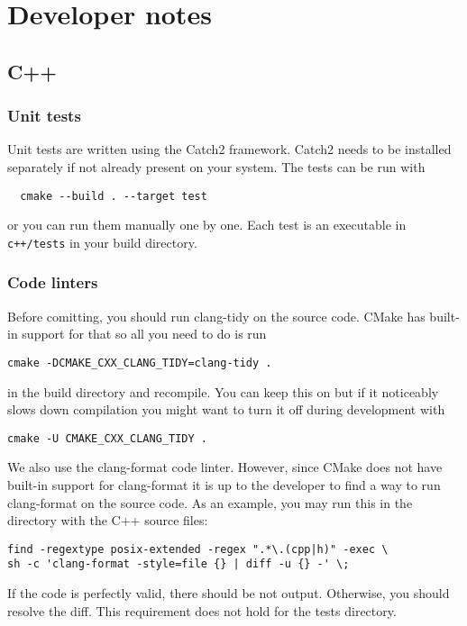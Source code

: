 \documentclass{article}
\begin{document}
\section{Developer notes}

\subsection{C++}

\subsubsection{Unit tests}

Unit tests are written using the Catch2 framework. Catch2 needs to be installed separately if not already present on your system. The tests can be run with
\begin{verbatim}
  cmake --build . --target test
\end{verbatim}
or you can run them manually one by one. Each test is an executable in \texttt{c++/tests} in your build directory.

\subsubsection{Code linters}

Before comitting, you should run clang-tidy on the source code. CMake has built-in support for that so all you need to do is run
\begin{verbatim}
cmake -DCMAKE_CXX_CLANG_TIDY=clang-tidy .
\end{verbatim}
in the build directory and recompile. You can keep this on but if it noticeably slows down compilation you might want to turn it off during development with
\begin{verbatim}
cmake -U CMAKE_CXX_CLANG_TIDY .
\end{verbatim}
We also use the clang-format code linter. However, since CMake does not have built-in support for clang-format it is up to the developer to find a way to run clang-format on the source code. As an example, you may run this in the directory with the C++ source files:
\begin{verbatim}
find -regextype posix-extended -regex ".*\.(cpp|h)" -exec \
sh -c 'clang-format -style=file {} | diff -u {} -' \;
\end{verbatim}
If the code is perfectly valid, there should be not output. Otherwise, you should resolve the diff. This requirement does not hold for the tests directory.
\end{document}
